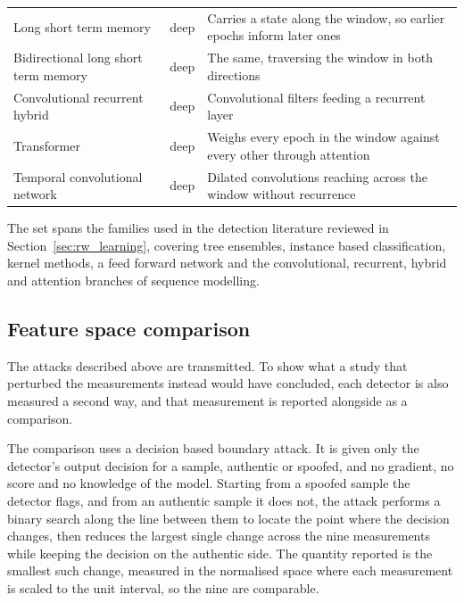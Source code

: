\documentclass[pdflatex,sn-basic]{sn-jnl}
\theoremstyle{thmstyleone}
\theoremstyle{thmstyletwo}
\theoremstyle{thmstylethree}
\begin{document}
\begin{table}[t]
\begin{tabular}{@{}p{3.6cm}lp{7.0cm}@{}}
Long short term memory & deep & Carries a state along the window, so earlier epochs
                                 inform later ones \citep{hochreiter1997long} \\
Bidirectional long short term memory & deep & The same, traversing the window in both
                                 directions \\
Convolutional recurrent hybrid & deep & Convolutional filters feeding a recurrent
                                 layer \\
Transformer        & deep & Weighs every epoch in the window against every other through
                                 attention \citep{vaswani2017attention} \\
Temporal convolutional network & deep & Dilated convolutions reaching across the window
                                 without recurrence \citep{bai2018empirical} \\
\bottomrule
\end{tabular}
\end{table}

The set spans the families used in the detection literature reviewed in
Section~\ref{sec:rw_learning}, covering tree ensembles, instance based classification,
kernel methods, a feed forward network and the convolutional, recurrent, hybrid and
attention branches of sequence modelling.

\subsection{Feature space comparison}
\label{sec:comparison}

The attacks described above are transmitted. To show what a study that perturbed the
measurements instead would have concluded, each detector is also measured a second way,
and that measurement is reported alongside as a comparison.

The comparison uses a decision based boundary attack. It is given only the detector's
output decision for a sample, authentic or spoofed, and no gradient, no score and no
knowledge of the model. Starting from a spoofed sample the detector flags, and from an
authentic sample it does not, the attack performs a binary search along the line between
them to locate the point where the decision changes, then reduces the largest single
change across the nine measurements while keeping the decision on the authentic side.
The quantity reported is the smallest such change, measured in the normalised space where
each measurement is scaled to the unit interval, so the nine are comparable.
\end{document}
